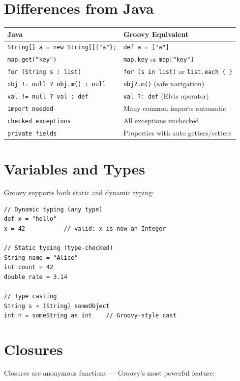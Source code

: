 \section{Differences from Java}
\label{sec:gp-diffs}

\begin{longtable}{P{4.8cm}P{5.7cm}}
\toprule
\textbf{Java} & \textbf{Groovy Equivalent} \\
\midrule
\endhead
\texttt{String[] a = new String[]\{"a"\};} & \texttt{def a = ["a"]} \\
\texttt{map.get("key")} & \texttt{map.key} or \texttt{map["key"]} \\
\texttt{for (String s : list)} & \texttt{for (s in list)} or \texttt{list.each \{ \}} \\
\texttt{obj != null ? obj.m() : null} & \texttt{obj?.m()} (safe navigation) \\
\texttt{val != null ? val : def} & \texttt{val ?: def} (Elvis operator) \\
\texttt{import needed} & Many common imports automatic \\
\texttt{checked exceptions} & All exceptions unchecked \\
\texttt{private fields} & Properties with auto getters/setters \\
\bottomrule
\end{longtable}

\section{Variables and Types}
\label{sec:gp-types}

Groovy supports both static and dynamic typing:

\begin{lstlisting}[style=groovy]
// Dynamic typing (any type)
def x = "hello"
x = 42           // valid: x is now an Integer

// Static typing (type-checked)
String name = "Alice"
int count = 42
double rate = 3.14

// Type casting
String s = (String) someObject
int n = someString as int    // Groovy-style cast
\end{lstlisting}

\section{Closures}
\label{sec:gp-closures}

Closures are anonymous functions --- Groovy's most powerful feature:

